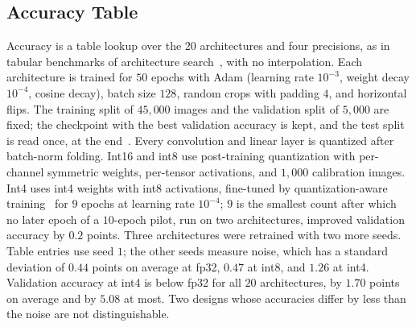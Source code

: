 \subsection{Accuracy Table}
\label{sec:accuracy}
Accuracy is a table lookup over the $20$ architectures and four
precisions, as in tabular benchmarks of architecture
search~\cite{dong2021nats}, with no interpolation. Each architecture is
trained for $50$ epochs with Adam (learning rate $10^{-3}$, weight decay
$10^{-4}$, cosine decay), batch size $128$, random crops with padding $4$, and
horizontal flips. The training split of $45{,}000$ images and the validation
split of $5{,}000$ are fixed; the checkpoint with the best validation accuracy
is kept, and the test split is read once, at the end~\cite{lones2024pitfalls}.
Every convolution and linear layer is quantized after batch-norm folding.
Int16 and int8 use post-training quantization with per-channel symmetric
weights, per-tensor activations, and $1{,}000$ calibration images. Int4 uses
int4 weights with int8 activations, fine-tuned by quantization-aware
training~\cite{sher2023qat} for $9$ epochs at learning rate $10^{-4}$; $9$ is
the smallest count after which no later epoch of a $10$-epoch pilot, run on
two architectures, improved validation accuracy by $0.2$ points. Three
architectures were retrained with two more seeds. Table entries use seed $1$;
the other seeds measure noise, which has a standard deviation of $0.44$
points on average at fp32, $0.47$ at int8, and $1.26$ at int4. Validation
accuracy at int4 is below fp32 for all $20$ architectures, by $1.70$ points on
average and by $5.08$ at most. Two designs whose accuracies differ by less
than the noise are not distinguishable.



